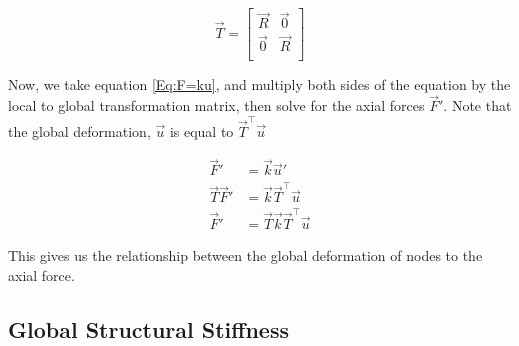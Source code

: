 \begin{equation}
	\vec{T}
	=	
	\begin{bmatrix}
		\vec{R} & \vec{0}\\
		\vec{0} & \vec{R}\\
	\end{bmatrix}
\end{equation}

Now, we take equation \ref{Eq:F=ku}, and multiply both sides of the equation by the local to global transformation matrix, then solve for the axial forces $\vec{F}'$. Note that the global deformation, $\vec{u}$ is equal to $\vec{T}^\intercal \vec{u}$

\begin{align}
	\vec{F}' &= \vec{k} \vec{u}'\\
	\vec{T} \vec{F}' &= \vec{k} \vec{T}^\intercal \vec{u}\\
	\vec{F}' &= \vec{T} \vec{k} \vec{T}^\intercal \vec{u}
\end{align}

This gives us the relationship between the global deformation of nodes to the axial force.

\subsection{Global Structural Stiffness}




